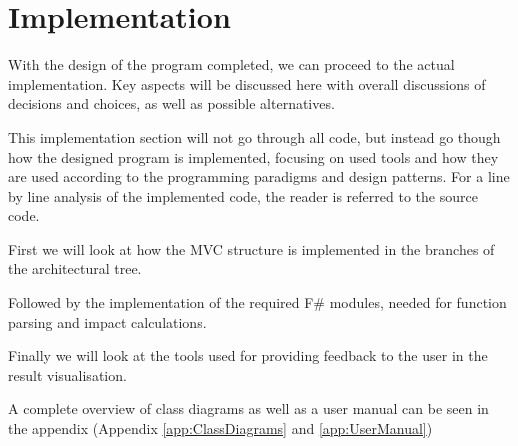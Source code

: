 \chapter{Implementation}\label{ch:Implementation}






With the design of the program completed, we can proceed to the actual implementation. Key aspects will be discussed here with overall discussions of decisions and choices, as well as possible alternatives. 

This implementation section will not go through all code, but instead go though how the designed program is implemented, focusing on used tools and how they are used according to the programming paradigms and design patterns. For a line by line analysis of the implemented code, the reader is referred to the source code. 

First we will look at how the MVC structure is implemented in the branches of the architectural tree. 

Followed by the implementation of the required F\# modules, needed for function parsing and impact calculations.

Finally we will look at the tools used for providing feedback to the user in the result visualisation.

A complete overview of class diagrams as well as a user manual can be seen in the appendix (Appendix \ref{app:ClassDiagrams} and \ref{app:UserManual})